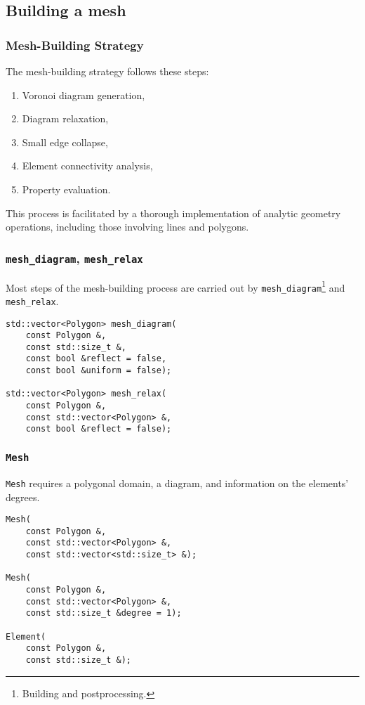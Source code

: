 \subsection{Building a mesh}

\begin{frame}
    \frametitle{Mesh-Building Strategy}

    The mesh-building strategy follows these steps:

    \begin{enumerate}
        \item Voronoi diagram generation,
        \item Diagram relaxation,
        \item Small edge collapse,
        \item Element connectivity analysis,
        \item Property evaluation.
    \end{enumerate}

    This process is facilitated by a thorough implementation of analytic geometry operations, including those involving lines and polygons.
\end{frame}

\begin{frame}[fragile]
    \frametitle{\lstinline{mesh_diagram}, \lstinline{mesh_relax}}

    Most steps of the mesh-building process are carried out by \lstinline{mesh_diagram}\footnote{Building and postprocessing.} and \lstinline{mesh_relax}.

\begin{lstlisting}[style=cpp]
std::vector<Polygon> mesh_diagram(
    const Polygon &, 
    const std::size_t &, 
    const bool &reflect = false, 
    const bool &uniform = false);

std::vector<Polygon> mesh_relax(
    const Polygon &, 
    const std::vector<Polygon> &, 
    const bool &reflect = false);
\end{lstlisting}

\end{frame}

\begin{frame}[fragile]
    \frametitle{\lstinline{Mesh}}

    \lstinline{Mesh} requires a polygonal domain, a diagram, and information on the elements' degrees.

\begin{lstlisting}[style=cpp]
Mesh(
    const Polygon &, 
    const std::vector<Polygon> &, 
    const std::vector<std::size_t> &);

Mesh(
    const Polygon &, 
    const std::vector<Polygon> &, 
    const std::size_t &degree = 1);

Element(
    const Polygon &, 
    const std::size_t &);
\end{lstlisting}

\end{frame}

